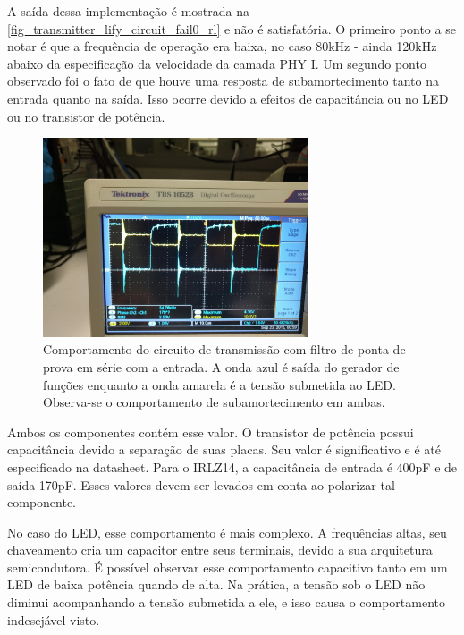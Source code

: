 		A saída dessa implementação é mostrada na \autoref{fig_transmitter_lify_circuit_fail0_rl} e não é satisfatória. O primeiro ponto a se notar é que a frequência de operação era baixa, no caso 80kHz - ainda 120kHz abaixo da especificação da velocidade da camada PHY I. Um segundo ponto observado foi o fato de que houve uma resposta de subamortecimento tanto na entrada quanto na saída. Isso ocorre devido a efeitos de capacitância ou no LED ou no transistor de potência.
		
		\begin{figure}[htb]
			\caption{\label{fig_transmitter_lify_circuit_fail0_rl} Comportamento do circuito de transmissão com filtro de ponta de prova em série com a entrada. A onda azul é saída do gerador de funções enquanto a onda amarela é a tensão submetida ao LED. Observa-se o comportamento de subamortecimento em ambas.}
			\centering		%
			\includegraphics[width=0.7\textwidth, trim={30cm 0cm 2cm 40cm}, clip]{circuits/photos/TX_probe_result.jpg}
		\end{figure}
	
		Ambos os componentes contém esse valor. O transistor de potência possui capacitância devido a separação de suas placas. Seu valor é significativo e é até especificado na datasheet. Para o IRLZ14, a capacitância de entrada é 400pF e de saída 170pF. Esses valores devem ser levados em conta ao polarizar tal componente. 

		No caso do LED, esse comportamento é mais complexo. A frequências altas, seu chaveamento cria um capacitor entre seus terminais, devido a sua arquitetura semicondutora. É possível observar esse comportamento capacitivo tanto em um LED de baixa potência quando de alta. Na prática, a tensão sob o LED não diminui acompanhando a tensão submetida a ele, e isso causa o comportamento indesejável visto.		
		
